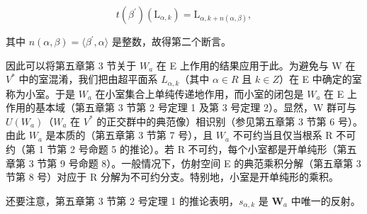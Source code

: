 \[
t (\beta^ {\prime}) \left(\mathrm{L} _ {\alpha , k}\right) = \mathrm{L} _ {\alpha , k + n (\alpha , \beta)},
\]

其中 \(n(\alpha, \beta) = \langle \beta^{\prime}, \alpha \rangle\) 是整数，故得第二个断言。

因此可以将第五章第 3 节关于 \(W_{a}\) 在 E 上作用的结果应用于此。为避免与 W 在 \(V^{*}\) 中的室混淆，我们把由超平面系 \(L_{\alpha,k}\)（其中 \(\alpha \in R\) 且 \(k \in Z\)）在 E 中确定的室称为小室。于是 \(W_{a}\) 在小室集合上单纯传递地作用，而小室的闭包是 \(W_{a}\) 在 E 上作用的基本域（第五章第 3 节第 2 号定理 1 及第 3 号定理 2）。显然，W 群可与 \(U(W_{a})\)（\(W_{a}\) 在 \(V^{*}\) 的正交群中的典范像）相识别（参见第五章第 3 节第 6 号）。由此 \(W_{a}\) 是本质的（第五章第 3 节第 7 号），且 \(W_{a}\) 不可约当且仅当根系 R 不可约（第 1 节第 2 号命题 5 的推论）。若 R 不可约，每个小室都是开单纯形（第五章第 3 节第 9 号命题 8）。一般情况下，仿射空间 E 的典范乘积分解（第五章第 3 节第 8 号）对应于 R 分解为不可约分支。特别地，小室是开单纯形的乘积。

还要注意，第五章第 3 节第 2 号定理 1 的推论表明，\(s_{\alpha,k}\) 是 \(\mathbf{W}_a\) 中唯一的反射。

